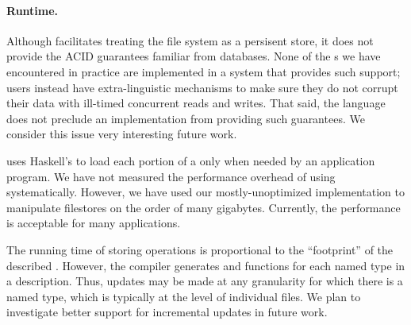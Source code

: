 \paragraph{Runtime.}
Although \forest{} facilitates treating the file system as a
persisent store, it does not provide the ACID guarantees familiar from
databases.  None of the \filestore{}s we
have encountered in practice are implemented in a system that provides
such support; users instead have extra-linguistic mechanisms to make
sure they do not corrupt their data with ill-timed concurrent reads
and writes. That said, the \forest{} language does not preclude an
implementation from providing such guarantees. We consider this issue
very interesting future work. 

\forest{} uses Haskell's  to load each portion
of a \filestore{} only when needed by an application program.
We have not measured the performance overhead of using
\forest{} systematically.  However, we have used our
mostly-unoptimized implementation to manipulate filestores on the
order of many gigabytes.  Currently, the performance is acceptable
for many applications.  

The running time of storing operations is proportional to the
``footprint'' of the described \filestore{}. However, the \forest{}
compiler generates  and  functions for each
named type in a description. Thus, updates may be made at any
granularity for which there is a named type, which is typically at the
level of individual files. We plan to investigate better support for
incremental updates in future work.



